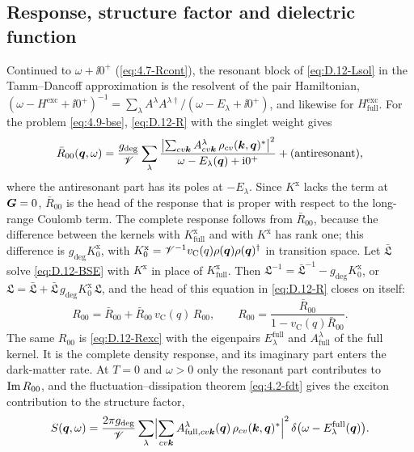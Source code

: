 \subsection*{Response, structure factor and dielectric function}

Continued to $\omega + \ii0^+$ (\cref{eq:4.7-Rcont}), the resonant block of \cref{eq:D.12-Lsol} in the Tamm--Dancoff approximation is the resolvent of the pair Hamiltonian, $(\omega - H^{\mathrm{exc}} + \ii0^+)^{-1} = \sum_\lambda A^\lambda A^{\lambda\dagger}/(\omega - E_\lambda + \ii0^+)$, and likewise for $H^{\mathrm{exc}}_{\mathrm{full}}$. For the problem \cref{eq:4.9-bse}, \cref{eq:D.12-R} with the singlet weight gives
\begin{equation}
  \bar R_{00}(\bm{q},\omega) = \frac{g_{\mathrm{deg}}}{\mathscr{V}}\sum_\lambda\frac{\bigl|\sum_{cv\bm{k}}A^\lambda_{cv\bm{k}}\,\rho_{cv}(\bm{k},\bm{q})^*\bigr|^2}{\omega - E_\lambda(\bm{q}) + \mathrm{i}0^+} + (\text{antiresonant}) ,
  \label{eq:D.12-Rexc}
\end{equation}
where the antiresonant part has its poles at $-E_\lambda$. Since $K^{\mathrm{x}}$ lacks the term at $\bm{G} = 0$, $\bar R_{00}$ is the head of the response that is proper with respect to the long-range Coulomb term. The complete response follows from $\bar R_{00}$, because the difference between the kernels with $K^{\mathrm{x}}_{\mathrm{full}}$ and with $K^{\mathrm{x}}$ has rank one; this difference is $g_{\mathrm{deg}}K^{\mathrm{x}}_0$, with $K^{\mathrm{x}}_0 = \mathscr{V}^{-1}v_{\mathrm{C}}(q)\rho(\bm{q})\rho(\bm{q})^\dagger$ in transition space. Let $\bar{\mathfrak{L}}$ solve \cref{eq:D.12-BSE} with $K^{\mathrm{x}}$ in place of $K^{\mathrm{x}}_{\mathrm{full}}$. Then $\mathfrak{L}^{-1} = \bar{\mathfrak{L}}^{-1} - g_{\mathrm{deg}}K^{\mathrm{x}}_0$, or $\mathfrak{L} = \bar{\mathfrak{L}} + \bar{\mathfrak{L}}\,g_{\mathrm{deg}}K^{\mathrm{x}}_0\,\mathfrak{L}$, and the head of this equation in \cref{eq:D.12-R} closes on itself:
\begin{equation*}
  R_{00} = \bar R_{00} + \bar R_{00}\,v_{\mathrm{C}}(q)\,R_{00}, \qquad R_{00} = \frac{\bar R_{00}}{1 - v_{\mathrm{C}}(q)\bar R_{00}} .
\end{equation*}
The same $R_{00}$ is \cref{eq:D.12-Rexc} with the eigenpairs $E^{\mathrm{full}}_\lambda$ and $A^\lambda_{\mathrm{full}}$ of the full kernel. It is the complete density response, and its imaginary part enters the dark-matter rate. At $T = 0$ and $\omega > 0$ only the resonant part contributes to $\operatorname{Im} R_{00}$, and the fluctuation--dissipation theorem \cref{eq:4.2-fdt} gives the exciton contribution to the structure factor,
\begin{equation}
  S(\bm{q},\omega) = \frac{2\pi g_{\mathrm{deg}}}{\mathscr{V}}\sum_\lambda\Bigl|\sum_{cv\bm{k}}A^\lambda_{\mathrm{full},cv\bm{k}}(\bm{q})\,\rho_{cv}(\bm{k},\bm{q})^*\Bigr|^2\,\delta\bigl(\omega - E^{\mathrm{full}}_\lambda(\bm{q})\bigr) .
  \label{eq:D.12-S}
\end{equation}


